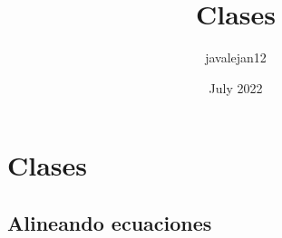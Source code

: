\documentclass{article}
\title{Clases}
\author{javalejan12 }
\date{July 2022}
\begin{document}
\maketitle

\section{Clases}

\subsection{Alineando ecuaciones}

\end{document}
